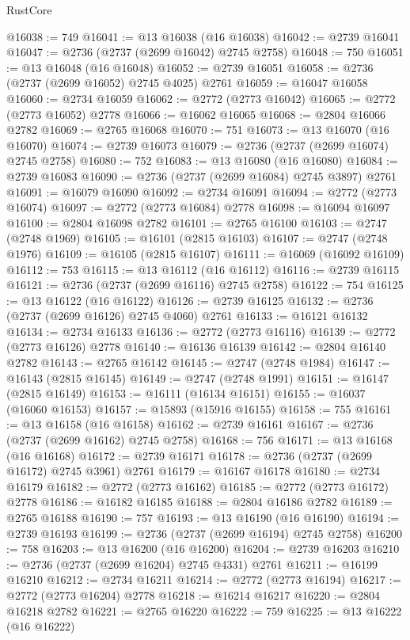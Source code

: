 \begin{lexlean}{RustCore}
\begin{coremodule}
@16038 := 749
@16041 := @13 @16038 (@16 @16038)
@16042 := @2739 @16041
@16047 := @2736 (@2737 (@2699 @16042) @2745 @2758)
@16048 := 750
@16051 := @13 @16048 (@16 @16048)
@16052 := @2739 @16051
@16058 := @2736 (@2737 (@2699 @16052) @2745 @4025) @2761
@16059 := @16047 @16058
@16060 := @2734 @16059
@16062 := @2772 (@2773 @16042)
@16065 := @2772 (@2773 @16052) @2778
@16066 := @16062 @16065
@16068 := @2804 @16066 @2782
@16069 := @2765 @16068
@16070 := 751
@16073 := @13 @16070 (@16 @16070)
@16074 := @2739 @16073
@16079 := @2736 (@2737 (@2699 @16074) @2745 @2758)
@16080 := 752
@16083 := @13 @16080 (@16 @16080)
@16084 := @2739 @16083
@16090 := @2736 (@2737 (@2699 @16084) @2745 @3897) @2761
@16091 := @16079 @16090
@16092 := @2734 @16091
@16094 := @2772 (@2773 @16074)
@16097 := @2772 (@2773 @16084) @2778
@16098 := @16094 @16097
@16100 := @2804 @16098 @2782
@16101 := @2765 @16100
@16103 := @2747 (@2748 @1969)
@16105 := @16101 (@2815 @16103)
@16107 := @2747 (@2748 @1976)
@16109 := @16105 (@2815 @16107)
@16111 := @16069 (@16092 @16109)
@16112 := 753
@16115 := @13 @16112 (@16 @16112)
@16116 := @2739 @16115
@16121 := @2736 (@2737 (@2699 @16116) @2745 @2758)
@16122 := 754
@16125 := @13 @16122 (@16 @16122)
@16126 := @2739 @16125
@16132 := @2736 (@2737 (@2699 @16126) @2745 @4060) @2761
@16133 := @16121 @16132
@16134 := @2734 @16133
@16136 := @2772 (@2773 @16116)
@16139 := @2772 (@2773 @16126) @2778
@16140 := @16136 @16139
@16142 := @2804 @16140 @2782
@16143 := @2765 @16142
@16145 := @2747 (@2748 @1984)
@16147 := @16143 (@2815 @16145)
@16149 := @2747 (@2748 @1991)
@16151 := @16147 (@2815 @16149)
@16153 := @16111 (@16134 @16151)
@16155 := @16037 (@16060 @16153)
@16157 := @15893 (@15916 @16155)
@16158 := 755
@16161 := @13 @16158 (@16 @16158)
@16162 := @2739 @16161
@16167 := @2736 (@2737 (@2699 @16162) @2745 @2758)
@16168 := 756
@16171 := @13 @16168 (@16 @16168)
@16172 := @2739 @16171
@16178 := @2736 (@2737 (@2699 @16172) @2745 @3961) @2761
@16179 := @16167 @16178
@16180 := @2734 @16179
@16182 := @2772 (@2773 @16162)
@16185 := @2772 (@2773 @16172) @2778
@16186 := @16182 @16185
@16188 := @2804 @16186 @2782
@16189 := @2765 @16188
@16190 := 757
@16193 := @13 @16190 (@16 @16190)
@16194 := @2739 @16193
@16199 := @2736 (@2737 (@2699 @16194) @2745 @2758)
@16200 := 758
@16203 := @13 @16200 (@16 @16200)
@16204 := @2739 @16203
@16210 := @2736 (@2737 (@2699 @16204) @2745 @4331) @2761
@16211 := @16199 @16210
@16212 := @2734 @16211
@16214 := @2772 (@2773 @16194)
@16217 := @2772 (@2773 @16204) @2778
@16218 := @16214 @16217
@16220 := @2804 @16218 @2782
@16221 := @2765 @16220
@16222 := 759
@16225 := @13 @16222 (@16 @16222)

\end{coremodule}
\end{lexlean}

